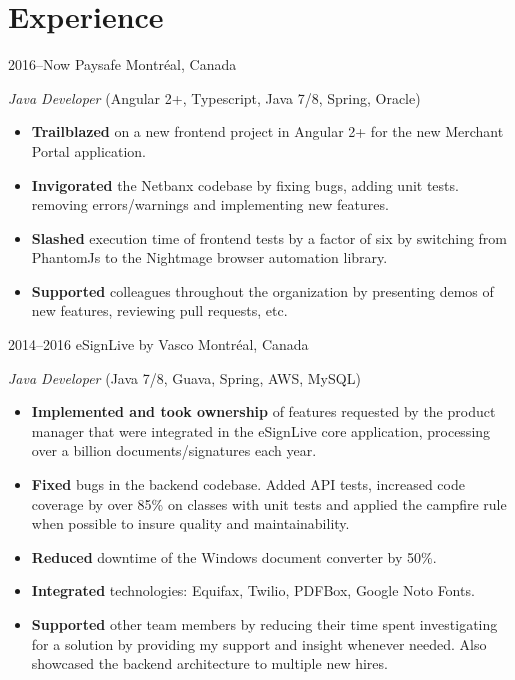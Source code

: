 \documentclass[]{friggeri-cv}
\begin{document}
\section{Experience}
\begin{entrylist}

\entry
{2016--Now}
{Paysafe}
{Montréal, Canada}
{\emph{Java Developer} (Angular 2+, Typescript, Java 7/8, Spring, Oracle)
\begin{itemize}
	\item \textbf{Trailblazed} on a new frontend project in Angular 2+ for the new Merchant Portal application.
	\item \textbf{Invigorated} the Netbanx codebase by fixing bugs, adding unit tests. removing errors/warnings and implementing new features.
	\item \textbf{Slashed} execution time of frontend tests by a factor of six by switching from PhantomJs to the Nightmage browser automation library.
	\item \textbf{Supported} colleagues throughout the organization by presenting demos of new features, reviewing pull requests, etc.
\end{itemize}
}


\entry
{2014--2016}
{eSignLive by Vasco}
{Montréal, Canada}
{\emph{Java Developer} (Java 7/8, Guava, Spring, AWS, MySQL)
\begin{itemize}
\item \textbf{Implemented and took ownership} of features requested by the product manager that were integrated in the eSignLive core application, processing over a billion documents/signatures each year.
\item \textbf{Fixed} bugs in the backend codebase. Added API tests, increased code coverage by over 85\% on classes with unit tests and applied the campfire rule when possible to insure quality and maintainability.
\item \textbf{Reduced} downtime of the Windows document converter by 50\%.
\item \textbf{Integrated} technologies: Equifax, Twilio, PDFBox, Google Noto Fonts.
\item \textbf{Supported} other team members by reducing their time spent investigating for a solution by providing my support and insight whenever needed. Also showcased the backend architecture to multiple new hires.
\end{itemize}
}


\end{entrylist}
\end{document}

